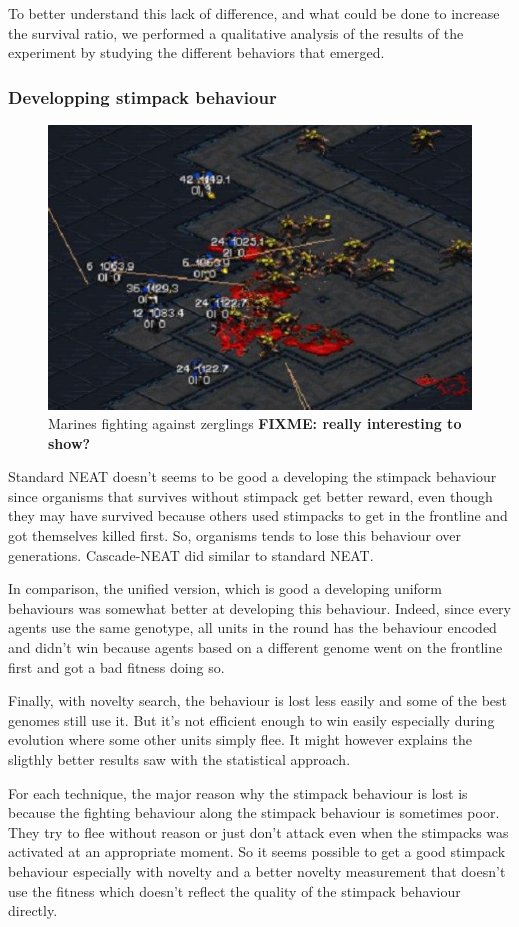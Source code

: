 To better understand this lack of difference, and what could be done
to increase the survival ratio, we performed a qualitative analysis of the
results of the experiment by studying the different behaviors that emerged.

\subsubsection{Developping stimpack behaviour}

\begin{figure}
    \includegraphics[width=.5\textwidth]{figures/marines_vs_zerglings_combat}
    \caption{Marines fighting against zerglings {\bf FIXME: really interesting to show?}}\label{fig:marines_vs_zerglings}
\end{figure}

Standard NEAT doesn’t seems to be good a developing the stimpack behaviour since organisms
that survives without stimpack get better reward,
even though they may have survived because others used stimpacks to get in the frontline
and got themselves killed first.
So, organisms tends to lose this behaviour over generations.
Cascade-NEAT did similar to standard NEAT.

In comparison, the unified version, which is good a developing uniform behaviours
was somewhat better at developing this behaviour.
Indeed, since every agents use the same genotype, all units in the round
has the behaviour encoded and didn't win because agents based on a different genome
went on the frontline first and got a bad fitness doing so.

Finally, with novelty search, the behaviour is lost less easily and some of the best genomes still use it.
But it's not efficient enough to win easily especially during evolution where some other units
simply flee. It might however explains the sligthly better results saw with the statistical approach.

For each technique, the major reason why the stimpack behaviour is lost is because the fighting behaviour along
the stimpack behaviour is sometimes poor. They try to flee without reason or just don't attack even when the
stimpacks was activated at an appropriate moment.
So it seems possible to get a good stimpack behaviour especially with novelty and a better novelty measurement
that doesn't use the fitness which doesn't reflect the quality of the stimpack behaviour directly.

